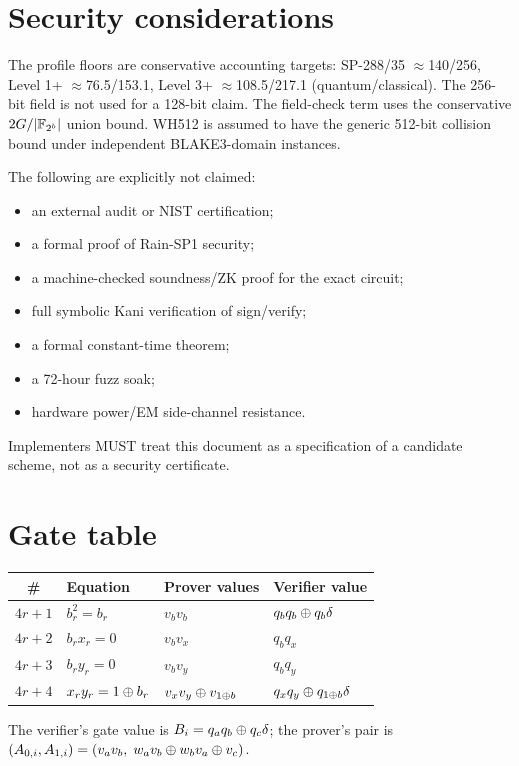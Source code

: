 \documentclass[11pt,a4paper]{article}
\begin{document}
\section{Security considerations}

The profile floors are conservative accounting targets:
SP-288/35 $\approx$140/256, Level 1+ $\approx$76.5/153.1, Level 3+
$\approx$108.5/217.1 (quantum/classical). The 256-bit field is not used for a
128-bit claim. The field-check term uses the conservative $2G/|\mathbb{F}_{2^{b}}|$ union
bound. WH512 is assumed to have the generic 512-bit collision bound under
independent BLAKE3-domain instances.

The following are explicitly not claimed:
\begin{itemize}
  \item an external audit or NIST certification;
  \item a formal proof of Rain-SP1 security;
  \item a machine-checked soundness/ZK proof for the exact circuit;
  \item full symbolic Kani verification of sign/verify;
  \item a formal constant-time theorem;
  \item a 72-hour fuzz soak;
  \item hardware power/EM side-channel resistance.
\end{itemize}

Implementers MUST treat this document as a specification of a candidate
scheme, not as a security certificate.

\appendix

\section{Gate table}

\begin{longtable}{@{}clll@{}}
\toprule
\# & Equation & Prover values & Verifier value \\
\midrule
\endhead
$4r+1$ & $b_r^2=b_r$ & $v_bv_b$ & $q_bq_b\oplus q_b\delta$ \\
$4r+2$ & $b_rx_r=0$ & $v_bv_x$ & $q_bq_x$ \\
$4r+3$ & $b_ry_r=0$ & $v_bv_y$ & $q_bq_y$ \\
$4r+4$ & $x_ry_r=1\oplus b_r$ & $v_xv_y\oplus v_{1\oplus b}$ & $q_xq_y\oplus q_{1\oplus b}\delta$ \\
\bottomrule
\end{longtable}

The verifier's gate value is
$B_i=q_aq_b\oplus q_c\delta$; the prover's pair is
$(A_{0,i},A_{1,i})=(v_av_b,\;w_av_b\oplus w_bv_a\oplus v_c)$.
\end{document}
